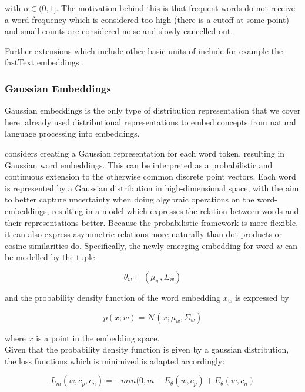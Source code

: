 \documentclass[a4paper,12pt,twoside,openright]{report}
\begin{document}
with $\alpha \in (0, 1]$.
The motivation behind this is that frequent words do not receive a word-frequency which is considered too high (there is a cutoff at some point) and small counts are considered noise and slowly cancelled out.

Further extensions which include other basic units of include for example the fastText embeddings \cite{bojanowski17}.

\subsubsection{Gaussian Embeddings}

Gaussian embeddings is the only type of distribution representation that we cover here. 
\cite{bengio06} already used distributional representations to embed concepts from natural language processing into embeddings.

\cite{vilnis14} considers creating a Gaussian representation for each word token, resulting in Gaussian word embeddings.
This can be interpreted as a probabilistic and continuous extension to the otherwise common discrete point vectors.
Each word is represented by a Gaussian distribution in high-dimensional space, with the aim to better capture uncertainty when doing algebraic operations on the word-embeddings, resulting in a model which expresses the relation between words and their representations better.
Because the probabilistic framework is more flexible, it can also express asymmetric relations more naturally than dot-products or cosine similarities do.  
Specifically, the newly emerging embedding for word $w$ can be modelled by the tuple 

$$
\theta_w = ( \mu_w,  \Sigma_w)
$$

and the probability density function of the word embedding $x_w$ is expressed by

\begin{equation}
p(x; w) = \mathcal{N}\left(x ; \mu_{w}, \Sigma_{w}\right)
\end{equation}

where $x$ is a point in the embedding space. \\

Given that the probability density function is given by a gaussian distribution, the loss functions which is minimized is adapted accordingly:

\begin{equation}
L_m(w, c_p, c_n) = - min(0, m - E_\theta(w, c_p) + E_\theta(w, c_n)
\end{equation}
\end{document}
